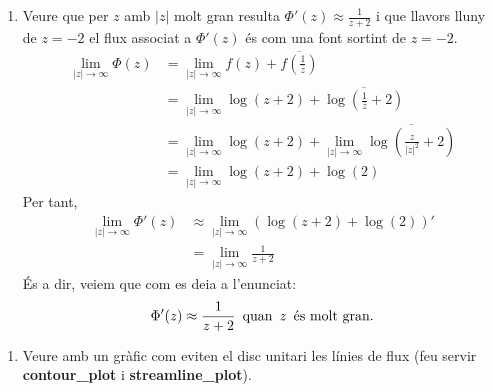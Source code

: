 \documentclass[a4paper, 11pt]{article}
\begin{document}
\begin{enumerate}[label=(\alph*)]
        \item Veure que per $z$ amb $|z|$ molt gran resulta $\Phi '(z) \approx \frac{1}{z+2}$ i que llavors lluny de $z = -2$ el flux associat a $\Phi '(z)$ és com una font sortint de $z = -2$.
        \begin{equation*}
            \begin{split}
                 \lim\limits_{|z|\to\infty} \Phi(z) & = \lim\limits_{|z|\to\infty} f(z) + \overline{f\left(\frac{1}{\overline{z}}\right)}\\
                        & = \lim\limits_{|z|\to\infty} \log(z+2) + \overline{\log\left(\frac{1}{\overline{z}}+2\right)}\\  
                        & = \lim\limits_{|z|\to\infty} \log(z+2) + \lim\limits_{|z|\to\infty} \overline{\log\left(\frac{z}{|z|^2}+2\right)}\\
                        & = \lim\limits_{|z|\to\infty} \log(z+2) + \log(2)
            \end{split}
        \end{equation*}
        Per tant, 
        \begin{equation*}
        \begin{split}
            \lim\limits_{|z|\to\infty} \Phi'(z) & \approx \lim\limits_{|z|\to\infty} \left( \log(z+2) + \log(2) \right)' \\
            & = \lim\limits_{|z|\to\infty} \frac{1}{z+2} 
            \end{split}
        \end{equation*}
        És a dir, veiem que com es deia a l'enunciat:
        $$\Phi'(z) \approx \frac{1}{z+2} \hspace{0.5 em} \text{quan} \hspace{0.5em } z \hspace{0.5em} \text{és molt gran.}$$
    
    \end{enumerate}
    \newpage
    \begin{enumerate}
        \item[\text{(d)}] Veure amb un gràfic com eviten el disc unitari les línies de flux (feu servir \textbf{contour\_plot} i \textbf{streamline\_plot}).
    \end{enumerate}
\end{document}
